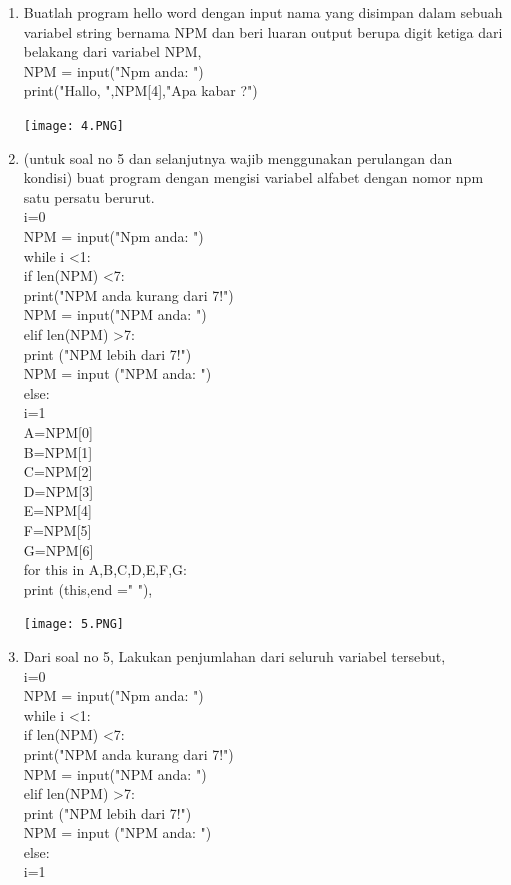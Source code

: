 \documentclass{article}
\begin{document}
\begin{enumerate}
\item Buatlah program hello word dengan input nama yang disimpan dalam sebuah variabel string bernama NPM dan beri luaran output berupa digit ketiga dari belakang dari variabel NPM,\\
NPM = input("Npm anda: ")\\
print("Hallo, ",NPM[4],"Apa kabar ?")\\
\begin{center}
    \texttt{[image: 4.PNG]}
\end{center}

\item (untuk soal no 5 dan selanjutnya wajib menggunakan perulangan dan kondisi) buat program dengan mengisi variabel alfabet dengan nomor npm satu persatu berurut.\\
i=0 \\
NPM = input("Npm anda: ")\\
while i <1:\\
    if len(NPM) <7:\\
        print("NPM anda kurang dari 7!")\\
        NPM = input("NPM anda: ")\\
    elif len(NPM) >7:\\
        print ("NPM lebih dari 7!")\\
        NPM = input ("NPM anda: ")\\
    else:\\
        i=1\\

A=NPM[0]\\
B=NPM[1]\\
C=NPM[2]\\
D=NPM[3]\\
E=NPM[4]\\
F=NPM[5]\\
G=NPM[6]\\

for this in A,B,C,D,E,F,G:\\
    print (this,end =" "),\\
\begin{center}
    \texttt{[image: 5.PNG]}
\end{center}

\item Dari soal no 5, Lakukan penjumlahan dari seluruh variabel tersebut,\\
i=0\\
NPM = input("Npm anda: ")\\
while i <1:\\
    if len(NPM) <7:\\
        print("NPM anda kurang dari 7!")\\
        NPM = input("NPM anda: ")\\
    elif len(NPM) >7:\\
        print ("NPM lebih dari 7!")\\
        NPM = input ("NPM anda: ")\\
    else:\\
        i=1\\


\end{enumerate}
\end{document}
